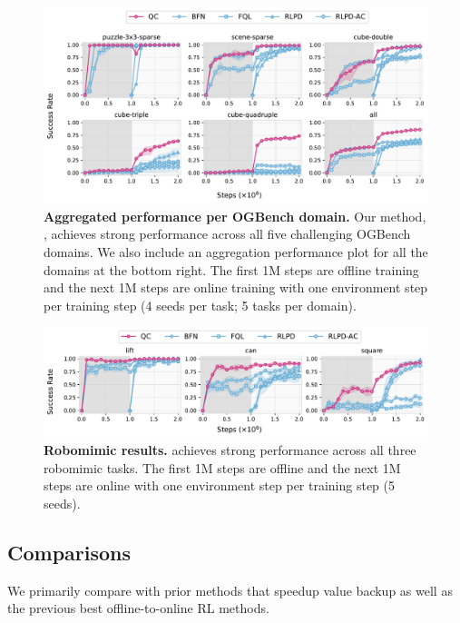 \begin{figure}[t]
    \centering
    \includegraphics[width=\linewidth]{figures/main-all-ablation.pdf} %
    \caption{\footnotesize \textbf{Aggregated performance per OGBench domain.} Our method, , achieves strong performance across all five challenging OGBench domains. We also include an aggregation performance plot for all the domains at the bottom right. The first 1M steps are offline training and the next 1M steps are online training with one environment step per training step (4 seeds per task; 5 tasks per domain).}
    \label{fig:main}
\end{figure}


\begin{figure}[t]
    \centering
    \includegraphics[width=\linewidth]{figures/robomimic-all-ablation.pdf} %
    \caption{\footnotesize \textbf{Robomimic results.}  achieves strong performance across all three robomimic tasks. The first 1M steps are offline and the next 1M steps are online with one environment step per training step (5 seeds).}
    \label{fig:main-robomimic}
\end{figure}



\subsection{Comparisons}
We primarily compare with prior methods that speedup value backup as well as the previous best offline-to-online RL methods.

